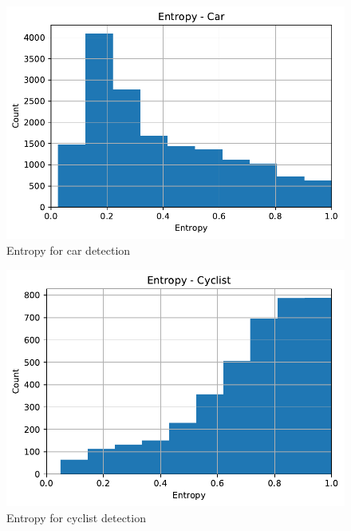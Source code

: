 \documentclass[10pt,twocolumn,letterpaper]{article}
\begin{document}
\begin{figure}[!htbp]
        \centering
		\includegraphics[scale = 0.4]{./images/Part-Bayesian F_Pointnet_Results/Entropy_Car.pdf}
        \caption[Extracted frustum point cloud after Normalization]{Entropy for car detection}
        \label{fig:Norm Point Cloud}
\end{figure}
\begin{figure}[!htbp]
        \centering
		\includegraphics[scale = 0.4]{images/Part-Bayesian F_Pointnet_Results/Entropy_Cyclist.pdf}
        \caption[Extracted frustum point cloud after Normalization]{Entropy for cyclist detection}
        \label{fig:Norm Point Cloud}
\end{figure}
\end{document}
